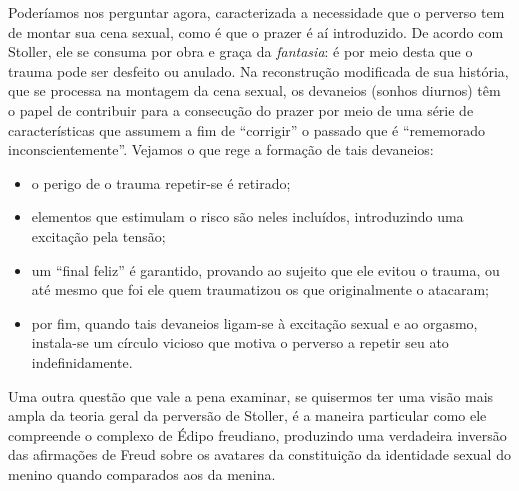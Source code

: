 Poderíamos nos perguntar agora, caracterizada a necessidade que o perverso
tem de montar sua cena sexual, como é que o prazer é aí introduzido. De
acordo com Stoller, ele se consuma por obra e graça da \textit{fantasia}: é
por meio desta que o trauma pode ser desfeito ou anulado. Na reconstrução
modificada de sua história, que se processa na montagem da cena sexual, os
devaneios (sonhos diurnos) têm o papel de contribuir para a consecução do
prazer por meio de uma série de características que assumem a fim de
“corrigir” o passado que é “rememorado inconscientemente”. Vejamos o que
rege a formação de tais devaneios:

\begin{itemize}
\item o perigo de o trauma repetir-se é retirado;
\item elementos que estimulam o risco são neles incluídos, introduzindo uma
excitação pela tensão;
\item um “final feliz” é garantido, provando ao sujeito que ele evitou o
trauma, ou até mesmo que foi ele quem traumatizou os que originalmente o
atacaram;
\item por fim, quando tais devaneios ligam-se à excitação sexual e ao
orgasmo, instala-se um círculo vicioso que motiva o perverso a repetir seu
ato indefinidamente.
\end{itemize}


Uma outra questão que vale a pena examinar, se quisermos ter uma visão mais
ampla da teoria geral da perversão de Stoller, é a maneira particular como
ele compreende o complexo de Édipo freudiano, produzindo uma verdadeira
inversão das afirmações de Freud sobre os avatares da constituição da
identidade sexual do menino quando comparados aos da menina.

